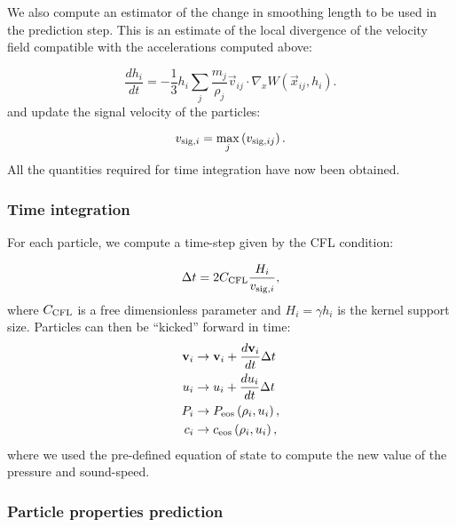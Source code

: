 We also compute an estimator of the change in smoothing length to be
used in the prediction step. This is an estimate of the local
divergence of the velocity field compatible with the accelerations
computed above:

\begin{equation}
  \frac{dh_i}{dt} = -\frac{1}{3}h_i \sum_j \frac{m_j}{\rho_j}
  \vec{v}_{ij}\cdot \nabla_x W(\vec{x}_{ij}, h_i).
  \label{eq:sph:minimal:dh_dt}
\end{equation}
and update the signal velocity of the particles:

\begin{equation}
  v_{{\rm sig},i} = \max_j \left( v_{{\rm sig},ij} \right).
  \label{eq:sph:minimal:v_sig_update}
\end{equation}
All the quantities required for time integration have now been obtained.

\subsubsection{Time integration}

For each particle, we compute a time-step given by the CFL condition:

\begin{equation}
  \Delta t = 2 C_{\rm CFL} \frac{H_i}{v_{{\rm sig},i}},
    \label{eq:sph:minimal:dt}
\end{equation}
where $C_{\rm CFL}$ is a free dimensionless parameter and $H_i = \gamma h_i$ is the
kernel support size. Particles can then be ``kicked'' forward in time:
\begin{align}
  \vec{v}_i &\rightarrow \vec{v}_i + \frac{d\vec{v}_i}{dt} \Delta t  \label{eq:sph:minimal:kick_v}\\
  u_i &\rightarrow u_i + \frac{du_i}{dt} \Delta t \label{eq:sph:minimal:kick_u}\\
  P_i &\rightarrow P_{\rm eos}\left(\rho_i, u_i\right) \label{eq:sph:minimal:kick_P}, \\
  c_i &\rightarrow c_{\rm eos}\left(\rho_i, u_i\right) \label{eq:sph:minimal:kick_c},
\end{align}
where we used the pre-defined equation of state to compute the new
value of the pressure and sound-speed.

\subsubsection{Particle properties prediction}

